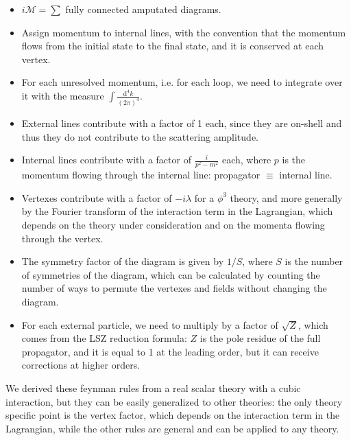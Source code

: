 \begin{itemize}
    \item \(i \mathcal{M} = \sum\) fully connected amputated diagrams.
    \item Assign momentum to internal lines, with the convention that the momentum flows from the initial state to the final state, and it is conserved at each vertex.
    \item For each unresolved momentum, i.e. for each loop, we need to integrate over it with the measure \(\int \frac{\mathrm{d}^4 k}{(2\pi)^4}\).
    \item External lines contribute with a factor of 1 each, since they are on-shell and thus they do not contribute to the scattering amplitude.
    \item Internal lines contribute with a factor of \(\frac{i}{p^2 - m^2}\) each, where \(p\) is the momentum flowing through the internal line: propagator \(\equiv\) internal line.
    \item Vertexes contribute with a factor of \(-i \lambda\) for a \(\phi^3\) theory, and more generally by the Fourier transform of the interaction term in the Lagrangian, which depends on the theory under consideration and on the momenta flowing through the vertex.
    \item The symmetry factor of the diagram is given by \(1/S\), where \(S\) is the number of symmetries of the diagram, which can be calculated by counting the number of ways to permute the vertexes and fields without changing the diagram.
    \item For each external particle, we need to multiply by a factor of \(\sqrt{Z}\), which comes from the LSZ reduction formula: \(Z\) is the pole residue of the full propagator, and it is equal to 1 at the leading order, but it can receive corrections at higher orders.
\end{itemize}

We derived these feynman rules from a real scalar theory with a cubic interaction, but they can be easily generalized to other theories: the only theory specific point is the vertex factor, which depends on the interaction term in the Lagrangian, while the other rules are general and can be applied to any theory.
